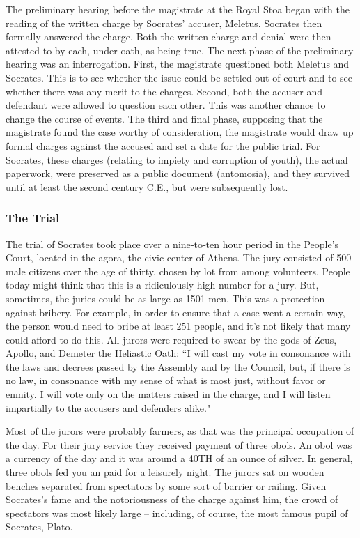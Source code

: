 The preliminary hearing before the magistrate at the Royal Stoa began with the reading of the written charge by Socrates' accuser, Meletus. Socrates then formally answered the charge. Both the written charge and denial were then attested to by each, under oath, as being true. The next phase of the preliminary hearing was an interrogation. First, the magistrate questioned both Meletus and Socrates. This is to see whether the issue could be settled out of court and to see whether there was any merit to the charges. Second, both the accuser and defendant were allowed to question each other. This was another chance to change the course of events. The third and final phase, supposing that the magistrate found the case worthy of consideration, the magistrate would draw up formal charges against the accused and set a date for the public trial. For Socrates, these charges (relating to impiety and corruption of youth), the actual paperwork, were preserved as a public document (antomosia), and they survived until at least the second century C.E., but were subsequently lost. 
\subsubsection{The Trial}

The trial of Socrates took place over a nine‐to‐ten hour period in the People's Court, located in the agora, the civic center of Athens. The jury consisted of 500 male citizens over the age of thirty, chosen by lot from among volunteers. People today might think that this is a ridiculously high number for a jury.  But, sometimes, the juries could be as large as 1501 men. This was a protection against bribery. For example, in order to ensure that a case went a certain way, the person would need to bribe at least 251 people, and it's not likely that many could afford to do this.  All jurors were required to swear by the gods of Zeus, Apollo, and Demeter the Heliastic Oath: ``I will cast my vote in consonance with the laws and decrees passed by the Assembly and by the Council, but, if there is no law, in consonance with my sense of what is most just, without favor or enmity. I will vote only on the matters raised in the charge, and I will listen impartially to the accusers and defenders alike."

Most of the jurors were probably farmers, as that was the principal occupation of the day. For their jury service they received payment of three obols. An obol was a currency of the day and it was around a 40TH of an ounce of silver. In general, three obols fed you an paid for a leisurely night. The jurors sat on wooden benches separated from spectators by some sort of barrier or railing. Given Socrates's fame and the notoriousness of the charge against him, the crowd of spectators was most likely large – including, of course, the most famous pupil of Socrates, Plato.

